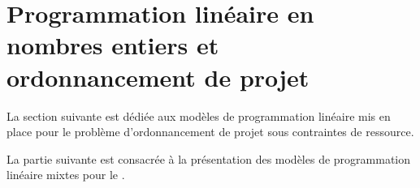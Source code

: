 \chapter{Programmation linéaire en nombres entiers et ordonnancement
  de projet}



La section suivante est dédiée aux modèles de programmation linéaire
mis en place pour le problème d'ordonnancement de projet sous
contraintes de ressource. 



La partie suivante est consacrée à la présentation des modèles de
programmation linéaire mixtes pour le \CECSP.
